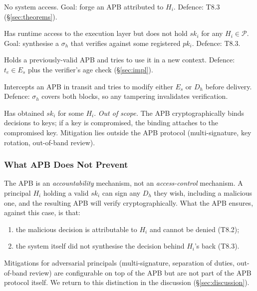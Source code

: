 \documentclass[11pt]{article}
\newcommand{\Pset}{\mathcal{P}}
\newcommand{\Es}{E_s}
\newcommand{\Dh}{D_h}
\newcommand{\sigh}{\sigma_h}
\newcommand{\Hi}{H_i}
\newcommand{\ski}{sk_i}
\newcommand{\pki}{pk_i}
\begin{document}
\begin{description}[leftmargin=2em, topsep=2pt]
  \item[A1. External attacker.] No system access. Goal: forge an APB
        attributed to $\Hi$. Defence: T8.3 (\S\ref{sec:theorems}).
  \item[A2. Compromised system process.] Has runtime access to the
        execution layer but does not hold $\ski$ for any
        $\Hi \in \Pset$. Goal: synthesise a $\sigh$ that verifies
        against some registered $\pki$. Defence: T8.3.
  \item[A3. Replay attacker.] Holds a previously-valid APB and tries
        to use it in a new context. Defence: $t_e \in \Es$ plus the
        verifier's age check (\S\ref{sec:impl}).
  \item[A4. Man-in-the-middle.] Intercepts an APB in transit and tries
        to modify either $\Es$ or $\Dh$ before delivery. Defence:
        $\sigh$ covers both blocks, so any tampering invalidates
        verification.
  \item[A5. Compromised principal.] Has obtained $\ski$ for some
        $\Hi$. \emph{Out of scope.} The APB cryptographically binds
        decisions to keys; if a key is compromised, the binding
        attaches to the compromised key. Mitigation lies outside
        the APB protocol (multi-signature, key rotation,
        out-of-band review).
\end{description}

\subsubsection{What APB Does Not Prevent}
The APB is an \emph{accountability} mechanism, not an
\emph{access-control} mechanism. A principal $\Hi$ holding a valid
$\ski$ can sign any $\Dh$ they wish, including a malicious one, and
the resulting APB will verify cryptographically. What the APB
ensures, against this case, is that:
\begin{enumerate}[leftmargin=2em, topsep=2pt, itemsep=1pt]
  \item the malicious decision is attributable to $\Hi$ and cannot
        be denied (T8.2);
  \item the system itself did not synthesise the decision behind
        $\Hi$'s back (T8.3).
\end{enumerate}
Mitigations for adversarial principals (multi-signature, separation
of duties, out-of-band review) are configurable on top of the APB
but are not part of the APB protocol itself. We return to this
distinction in the discussion (\S\ref{sec:discussion}).
\end{document}
